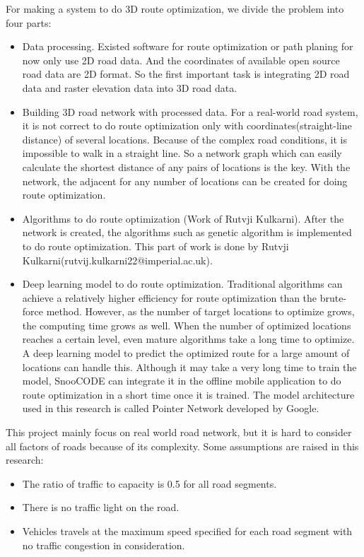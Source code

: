 \documentclass[final-report]{report-template}
\begin{document}
For making a system to do 3D route optimization, we divide the problem into four parts: 
\begin{itemize}
    \item Data processing. Existed software for route optimization or path planing for now only use 2D road data.
          And the coordinates of available open source road data are 2D format.
          So the first important task is integrating 2D road data and raster elevation data into 3D road data.
    \item Building 3D road network with processed data. 
          For a real-world road system, it is not correct to do route optimization only with coordinates(straight-line distance) of several locations.
          Because of the complex road conditions, it is impossible to walk in a straight line.
          So a network graph which can easily calculate the shortest distance of any pairs of locations is the key.
          With the network, the adjacent for any number of locations can be created for doing route optimization.
    \item Algorithms to do route optimization (Work of Rutvji Kulkarni). 
          After the network is created, the algorithms such as genetic algorithm is implemented to do route optimization.
          This part of work is done by Rutvji Kulkarni(rutvij.kulkarni22@imperial.ac.uk).
    \item Deep learning model to do route optimization. 
          Traditional algorithms can achieve a relatively higher efficiency for route optimization than the brute-force method.
          However, as the number of target locations to optimize grows, the computing time grows as well.
          When the number of optimized locations reaches a certain level, even mature algorithms take a long time to optimize.
          A deep learning  model to predict the optimized route for a large amount of locations can handle this.
          Although it may take a very long time to train the model, 
          SnooCODE can integrate it in the offline mobile application to do route optimization in a short time once it is trained.
          The model architecture used in this research is called Pointer Network developed by Google.
\end{itemize}

This project mainly focus on real world road network, 
but it is hard to consider all factors of roads because of its complexity.
Some assumptions are raised in this research:
\begin{itemize}
    \item The ratio of traffic to capacity is 0.5 for all road segments.
    \item There is no traffic light on the road.
    \item Vehicles travels at the maximum speed specified for each road segment with no traffic congestion in consideration.
\end{itemize}
\end{document}
